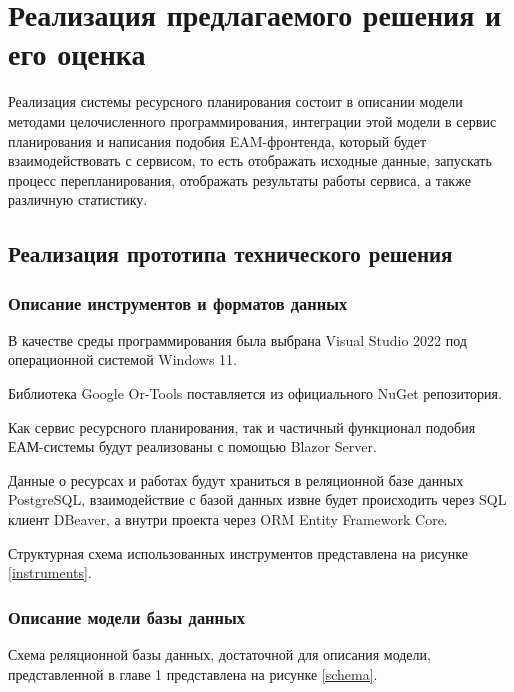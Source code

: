\section{Реализация предлагаемого решения и его оценка}

Реализация системы ресурсного планирования состоит в описании модели методами целочисленного программирования, интеграции этой модели в сервис планирования и написания подобия EAM-фронтенда, который будет взаимодействовать с сервисом, то есть отображать исходные данные, запускать процесс перепланирования, отображать результаты работы сервиса, а также различную статистику.

\subsection{Реализация прототипа технического решения}

\subsubsection{Описание инструментов и форматов данных}

В качестве среды программирования была выбрана Visual Studio 2022 под операционной системой Windows 11.

Библиотека Google Or-Tools поставляется из официального NuGet репозитория.

Как сервис ресурсного планирования, так и частичный функционал подобия ЕАМ-системы будут реализованы с помощью Blazor Server.

Данные о ресурсах и работах будут храниться в реляционной базе данных PostgreSQL, взаимодействие с базой данных извне будет происходить через SQL клиент DBeaver, а внутри проекта через ORM Entity Framework Core.

Структурная схема использованных инструментов представлена на рисунке \ref{instruments}.


\subsubsection{Описание модели базы данных}

Схема реляционной базы данных, достаточной для описания модели, представленной в главе 1 представлена на рисунке \ref{schema}.


